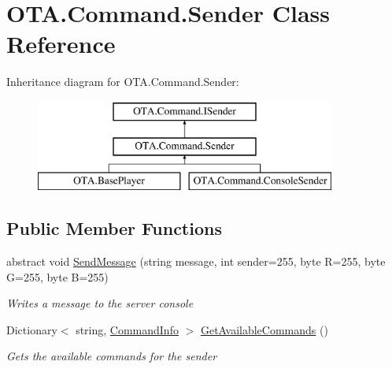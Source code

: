 \hypertarget{class_o_t_a_1_1_command_1_1_sender}{}\section{O\+T\+A.\+Command.\+Sender Class Reference}
\label{class_o_t_a_1_1_command_1_1_sender}
Inheritance diagram for O\+T\+A.\+Command.\+Sender\+:\begin{figure}[H]
\begin{center}
\leavevmode
\includegraphics[height=3.000000cm]{class_o_t_a_1_1_command_1_1_sender}
\end{center}
\end{figure}
\subsection*{Public Member Functions}
\begin{DoxyCompactItemize}
\item 
abstract void \hyperlink{class_o_t_a_1_1_command_1_1_sender_ab4cea2690d2299d322ec51cce16ec7a4}{Send\+Message} (string message, int sender=255, byte R=255, byte G=255, byte B=255)
\begin{DoxyCompactList}\small\item\em Writes a message to the server console \end{DoxyCompactList}\item 
Dictionary$<$ string, \hyperlink{class_o_t_a_1_1_command_1_1_command_info}{Command\+Info} $>$ \hyperlink{class_o_t_a_1_1_command_1_1_sender_ab84377a94881af48dc7d787ec44290de}{Get\+Available\+Commands} ()
\begin{DoxyCompactList}\small\item\em Gets the available commands for the sender \end{DoxyCompactList}\end{DoxyCompactItemize}
